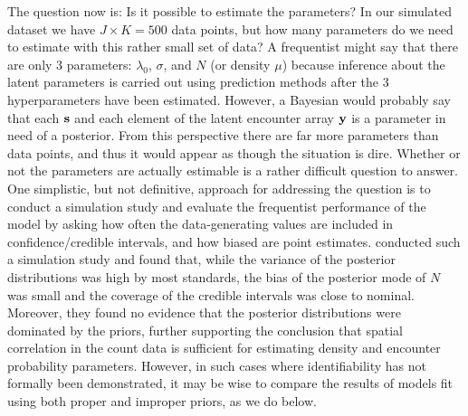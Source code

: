The question now is: Is it possible to estimate the parameters? In our
simulated dataset we have $J \times K = 500$ data points, but how many
parameters do we need to estimate with this rather small set of data?
A frequentist might say that there are only 3 parameters: $\lambda_0$,
$\sigma$, and $N$ (or density $\mu$) because inference about the
latent parameters is carried out using prediction methods after the 3
hyperparameters have been estimated. However, a Bayesian would
probably say that each $\bf s$ and each element of the latent
encounter array $\bf y$ is a parameter in need of a posterior. From
this perspective there are far more parameters than data points, and
thus it would appear as though the situation is dire. Whether or not
the parameters are actually estimable is a rather difficult question
to answer. One simplistic, but not definitive, approach for addressing
the question is to conduct a simulation study and evaluate the
frequentist performance of the model by asking how often the
data-generating values are included in confidence/credible intervals,
and how biased are point estimates. \citet{chandler_royle:2012}
conducted such a simulation study and found that, while the variance
of the posterior distributions was high by most standards, the bias of
the posterior mode of $N$ was small and the coverage of the credible
intervals was close to nominal. Moreover, they found no evidence that the
posterior distributions were dominated by the priors, further
supporting the conclusion that spatial correlation in the count data
is sufficient for estimating density and encounter probability
parameters. %
However, in such cases where identifiability has not formally been
demonstrated, it may be wise to compare the results of models fit
using both proper and improper priors, as we do below.

